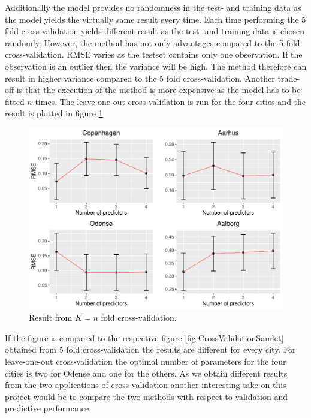 Additionally the model provides no randomness in the test- and training data as the model yields the virtually same result every time.
Each time performing the 5 fold cross-validation yields different result as the test- and training data is chosen randomly.
However, the method has not only advantages compared to the 5 fold cross-validation.
RMSE varies as the testset contains only one observation. 
If the observation is an outlier then the variance will be high.
The method therefore can result in higher variance compared to the 5 fold cross-validation.
Another trade-off is that the execution of the method is more expensive as the model has to be fitted $n$ times.
The leave one out cross-validation is run for the four cities and the result is plotted in figure \ref{fig:cv_k=n}.
\begin{figure}[H]
        \centering
      \includegraphics[width = 0.75 \textwidth]{figures/Nanna/k=n.pdf}
      \caption{Result from $K = n$ fold cross-validation.}
      \label{fig:cv_k=n}
\end{figure}
If the figure is compared to the respective figure \ref{fig:CrossValidationSamlet} obtained from 5 fold cross-validation the results are different for every city.
For leave-one-out cross-validation the optimal number of parameters for the four cities is two for Odense and one for the others.
As we obtain different results from the two applications of cross-validation another interesting take on this project would be to compare the two methods with respect to validation and predictive performance.